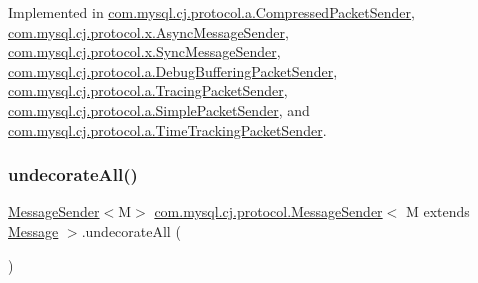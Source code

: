 Implemented in \mbox{\hyperlink{classcom_1_1mysql_1_1cj_1_1protocol_1_1a_1_1_compressed_packet_sender_a3784dddfd77b45c384a6bb19f67fc2cc}{com.\+mysql.\+cj.\+protocol.\+a.\+Compressed\+Packet\+Sender}}, \mbox{\hyperlink{classcom_1_1mysql_1_1cj_1_1protocol_1_1x_1_1_async_message_sender_a4e7623346f23221fb9ff562c11c851e6}{com.\+mysql.\+cj.\+protocol.\+x.\+Async\+Message\+Sender}}, \mbox{\hyperlink{classcom_1_1mysql_1_1cj_1_1protocol_1_1x_1_1_sync_message_sender_aa8fd388e5d4e5e86cb35add7f6e45c7b}{com.\+mysql.\+cj.\+protocol.\+x.\+Sync\+Message\+Sender}}, \mbox{\hyperlink{classcom_1_1mysql_1_1cj_1_1protocol_1_1a_1_1_debug_buffering_packet_sender_a64d9081f4ce1701a67747cbb9462d4f3}{com.\+mysql.\+cj.\+protocol.\+a.\+Debug\+Buffering\+Packet\+Sender}}, \mbox{\hyperlink{classcom_1_1mysql_1_1cj_1_1protocol_1_1a_1_1_tracing_packet_sender_aed3dc47d6e7a4dad4761e05b2f9213de}{com.\+mysql.\+cj.\+protocol.\+a.\+Tracing\+Packet\+Sender}}, \mbox{\hyperlink{classcom_1_1mysql_1_1cj_1_1protocol_1_1a_1_1_simple_packet_sender_a7258a5245f263cf4635daba8be258e36}{com.\+mysql.\+cj.\+protocol.\+a.\+Simple\+Packet\+Sender}}, and \mbox{\hyperlink{classcom_1_1mysql_1_1cj_1_1protocol_1_1a_1_1_time_tracking_packet_sender_a5e29cda7005857f658352ef487c541ac}{com.\+mysql.\+cj.\+protocol.\+a.\+Time\+Tracking\+Packet\+Sender}}.

\mbox{\label{interfacecom_1_1mysql_1_1cj_1_1protocol_1_1_message_sender_a8066931f03c2fa9cc705716fa10a4517}} 
\subsubsection{\texorpdfstring{undecorate\+All()}{undecorateAll()}}
{\footnotesize\ttfamily \mbox{\hyperlink{interfacecom_1_1mysql_1_1cj_1_1protocol_1_1_message_sender}{Message\+Sender}}$<$M$>$ \mbox{\hyperlink{interfacecom_1_1mysql_1_1cj_1_1protocol_1_1_message_sender}{com.\+mysql.\+cj.\+protocol.\+Message\+Sender}}$<$ M extends \mbox{\hyperlink{interfacecom_1_1mysql_1_1cj_1_1protocol_1_1_message}{Message}} $>$.undecorate\+All (\begin{DoxyParamCaption}{ }\end{DoxyParamCaption})}

